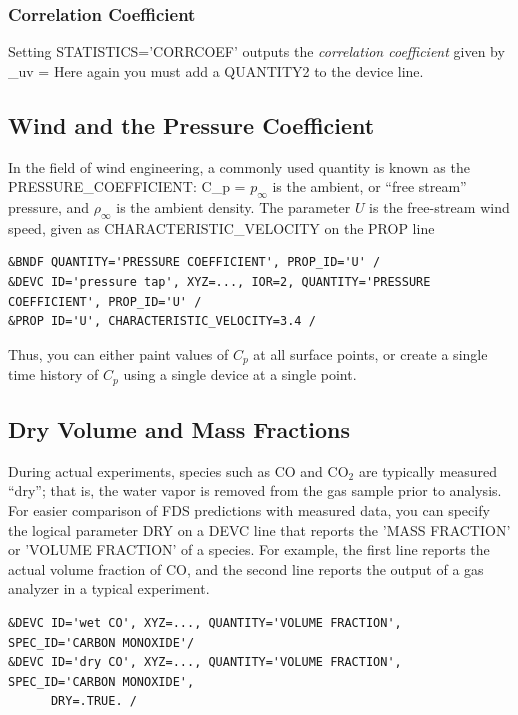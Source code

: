 \documentclass[11pt]{book}
\begin{document}
\subsubsection{Correlation Coefficient}
\label{info:corrcoef}

Setting {\ct STATISTICS='CORRCOEF'} outputs the \emph{correlation coefficient} given by
\be
   \rho_{uv} = 
\ee
Here again you must add a {\ct QUANTITY2} to the device line.

\subsection{Wind and the Pressure Coefficient}
\label{info:pressure_coefficient}

In the field of wind engineering, a commonly used quantity is known as
the {\ct PRESSURE\_COEFFICIENT}:
\be
   C_p = 
\ee
$p_\infty$ is the ambient, or ``free stream'' pressure, and
$\rho_\infty$ is the ambient density.  The parameter $U$ is the
free-stream wind speed, given as {\ct CHARACTERISTIC\_VELOCITY} on the
{\ct PROP} line

\begin{lstlisting}
&BNDF QUANTITY='PRESSURE COEFFICIENT', PROP_ID='U' /
&DEVC ID='pressure tap', XYZ=..., IOR=2, QUANTITY='PRESSURE COEFFICIENT', PROP_ID='U' /
&PROP ID='U', CHARACTERISTIC_VELOCITY=3.4 /
\end{lstlisting}

\noindent
Thus, you can either paint values of $C_p$ at all surface points, or create a single time history of $C_p$ using a single device at a single point.


\subsection{Dry Volume and Mass Fractions}
\label{info:dry}

During actual experiments, species such as CO and CO$_2$ are typically measured ``dry''; that is, the water vapor is removed from the gas sample prior to analysis.  For easier comparison of FDS predictions with measured data,
you can specify the logical parameter {\ct DRY} on a {\ct DEVC} line that reports the {\ct 'MASS FRACTION'} or {\ct 'VOLUME FRACTION'} of a species.  For example, the first line reports the actual volume fraction of CO, and the second line reports the output of a gas analyzer in a typical experiment.

\begin{lstlisting}
&DEVC ID='wet CO', XYZ=..., QUANTITY='VOLUME FRACTION', SPEC_ID='CARBON MONOXIDE'/
&DEVC ID='dry CO', XYZ=..., QUANTITY='VOLUME FRACTION', SPEC_ID='CARBON MONOXIDE',
      DRY=.TRUE. /
\end{lstlisting}
\end{document}
